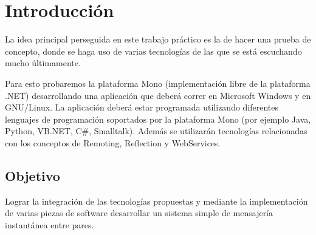 \section{Introducción}

La idea principal perseguida en este trabajo práctico es la de hacer una prueba
de concepto, donde se haga uso de varias tecnologías de las que se está
escuchando mucho últimamente.

Para esto probaremos la plataforma Mono (implementación libre de la plataforma
.NET) desarrollando una aplicación que deberá correr en Microsoft Windows y en
GNU/Linux. La aplicación deberá estar programada utilizando diferentes
lenguajes de programación soportados por la plataforma Mono (por ejemplo Java,
Python, VB.NET, C\#, Smalltalk). Además se utilizarán tecnologías relacionadas
con los conceptos de Remoting, Reflection y WebServices.


\subsection{Objetivo}

Lograr la integración de las tecnologías propuestas y mediante la
implementación de varias piezas de software desarrollar un sistema simple de
mensajería instantánea entre pares.

